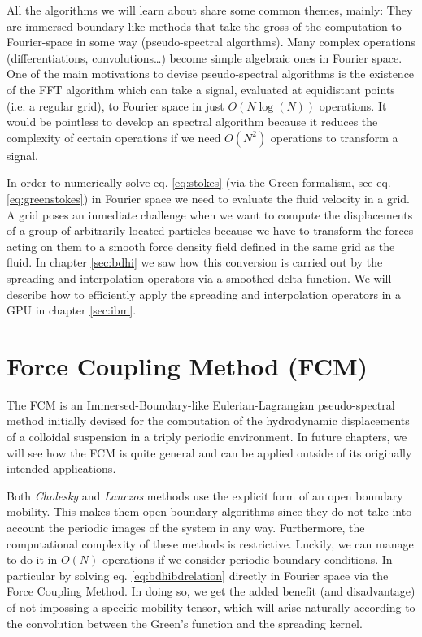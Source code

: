 \documentclass[ twoside,openright,titlepage,numbers=noenddot,%
headinclude,footinclude,cleardoublepage=empty,abstract=on,
BCOR=5mm,paper=a4,fontsize=11pt, dvipsnames
]{scrreprt}
\newcommand{\gpu}{\gls{GPU}\xspace}
\begin{document}
All the algorithms we will learn about share some common themes, mainly: They are immersed boundary-like methods\cite{Peskin2002} that take the gross of the computation to Fourier-space in some way (pseudo-spectral algorthms). Many complex operations (differentiations, convolutions\dots) become simple algebraic ones in Fourier space. One of the main motivations to devise pseudo-spectral algorithms is the existence of the \gls{FFT} algorithm which can take a signal, evaluated at equidistant points (i.e. a regular grid), to Fourier space in just $O(N\log(N))$ operations. It would be pointless to develop an spectral algorithm because it reduces the complexity of certain operations if we need $O(N^2)$ operations to transform a signal.

In order to numerically solve eq. \eqref{eq:stokes} (via the Green formalism, see eq. \eqref{eq:greenstokes}) in Fourier space we need to evaluate the fluid velocity in a grid.
A grid poses an inmediate challenge when we want to compute the displacements of a group of arbitrarily located particles because we have to transform the forces acting on them to a smooth force density field defined in the same grid as the fluid. In chapter \ref{sec:bdhi} we saw how this conversion is carried out by the spreading and interpolation operators via a smoothed delta function. We will describe how to efficiently apply the spreading and interpolation operators in a \gpu in chapter \ref{sec:ibm}.



\section{Force Coupling Method (FCM)}\label{sec:fcm}
The \gls{FCM}\cite{Keaveny2014} is an Immersed-Boundary-like Eulerian-Lagrangian pseudo-spectral method initially devised for the computation of the hydrodynamic displacements of a colloidal suspension in a triply periodic environment. In future chapters, we will see how the \gls{FCM} is quite general and can be applied outside of its originally intended applications.

Both \emph{Cholesky} and \emph{Lanczos} methods use the explicit form of an open boundary mobility. This makes them open boundary algorithms since they do not take into account the periodic images of the system in any way. Furthermore, the computational complexity of these methods is restrictive. Luckily, we can manage to do it in $O(N)$ operations if we consider periodic boundary conditions. In particular by solving eq. \eqref{eq:bdhibdrelation} directly in Fourier space via the Force Coupling Method\cite{Keaveny2014}. In doing so, we get the added benefit (and disadvantage) of not impossing a specific mobility tensor, which will arise naturally according to the convolution between the Green's function and the spreading kernel.
\end{document}
